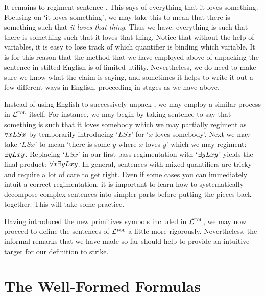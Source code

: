 It remains to regiment sentence .
This says of everything that it loves something.
Focusing on `it loves something', we may take this to mean that there is something such that \textit{it loves that thing}.
Thus we have: everything is such that there is something such that it loves that thing.
Notice that without the help of variables, it is easy to lose track of which quantifier is binding which variable.
It is for this reason that the method that we have employed above of unpacking the sentence in stilted English is of limited utility.
Nevertheless, we do need to make sure we know what the claim is saying, and sometimes it helps to write it out a few different ways in English, proceeding in stages as we have above.

Instead of using English to successively unpack , we may employ a similar process in $\mathcal{L}^{\textsc{fol}}$ itself. 
For instance, we may begin by taking sentence  to say that something is such that it loves somebody which we may partially regiment as $\forall x LS x$ by temporarily introducing `$LSx$' for `$x$ loves somebody'.
Next we may take `$LS x$' to mean `there is some $y$ where $x$ loves $y$' which we may regiment: $\exists y Lxy$.
Replacing `$LS x$' in our first pass regimentation with `$\exists y Lxy$' yields the final product: $\forall x \exists y Lxy$.
In general, sentences with mixed quantifiers are tricky and require a lot of care to get right.
Even if some cases you can immediately intuit a correct regimentation, it is important to learn how to systematically decompose complex sentences into simpler parts before putting the pieces back together.
This will take some practice.

Having introduced the new primitives symbols included in $\mathcal{L}^{\textsc{fol}}$, we may now proceed to define the sentences of $\mathcal{L}^{\textsc{fol}}$ a little more rigorously.
Nevertheless, the informal remarks that we have made so far should help to provide an intuitive target for our definition to strike.





\section{The Well-Formed Formulas}

